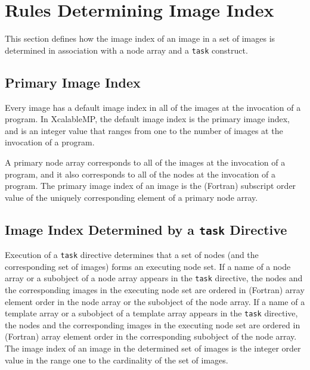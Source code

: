 \section{Rules Determining Image Index}
This section defines how the image index of an image in a set of images
is determined in association with a node array and a {\tt task} construct.



\subsection{Primary Image Index}
Every image has a default image index in all of the images at the
invocation of a program. 
In XcalableMP, the default image index is the primary image index,
and is an integer value that ranges from one to the number of images
at the invocation of a program. 

A primary node array corresponds to all of the images at the invocation of
a program, and it also corresponds to all of the nodes at the invocation of
a program.
The primary image index of an image is the (Fortran) subscript order value of 
the uniquely corresponding element of a primary node array.


\subsection{Image Index Determined by a {\tt task} Directive}

Execution of a {\tt task} directive determines that a set of nodes (and
the corresponding set of images) forms an executing node set.
If a name of a node array or a subobject of a node array 
appears in the {\tt task} directive, the nodes and the corresponding 
images in the executing node set are ordered in (Fortran) array element order in
the node array or the subobject of the node array.
If a name of a template array or a subobject of a template array
appears in the {\tt task} directive, the nodes and the corresponding images 
in the executing node set 
are ordered in (Fortran) array element order in the corresponding 
subobject of the node array.
The image index of an image in the determined set of images 
is the integer order value in the range one to the cardinality of the set of images.


